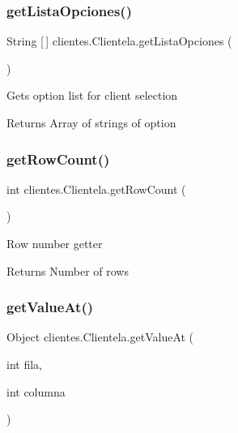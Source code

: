 \subsubsection{\texorpdfstring{get\+Lista\+Opciones()}{getListaOpciones()}}
{\footnotesize\ttfamily String \mbox{[}$\,$\mbox{]} clientes.\+Clientela.\+get\+Lista\+Opciones (\begin{DoxyParamCaption}{ }\end{DoxyParamCaption})\hspace{0.3cm}{\ttfamily [inline]}}

Gets option list for client selection \begin{DoxyReturn}{Returns}
Array of strings of option 
\end{DoxyReturn}
\mbox{\label{classclientes_1_1_clientela_a2637748da710e9aa18044fd614d3e1cc}} 
\subsubsection{\texorpdfstring{get\+Row\+Count()}{getRowCount()}}
{\footnotesize\ttfamily int clientes.\+Clientela.\+get\+Row\+Count (\begin{DoxyParamCaption}{ }\end{DoxyParamCaption})\hspace{0.3cm}{\ttfamily [inline]}}

Row number getter \begin{DoxyReturn}{Returns}
Number of rows 
\end{DoxyReturn}
\mbox{\label{classclientes_1_1_clientela_a58c7e701ceb7a1eb87d4aa996fc1e546}} 
\subsubsection{\texorpdfstring{get\+Value\+At()}{getValueAt()}}
{\footnotesize\ttfamily Object clientes.\+Clientela.\+get\+Value\+At (\begin{DoxyParamCaption}\item[{int}]{fila,  }\item[{int}]{columna }\end{DoxyParamCaption})\hspace{0.3cm}{\ttfamily [inline]}}

